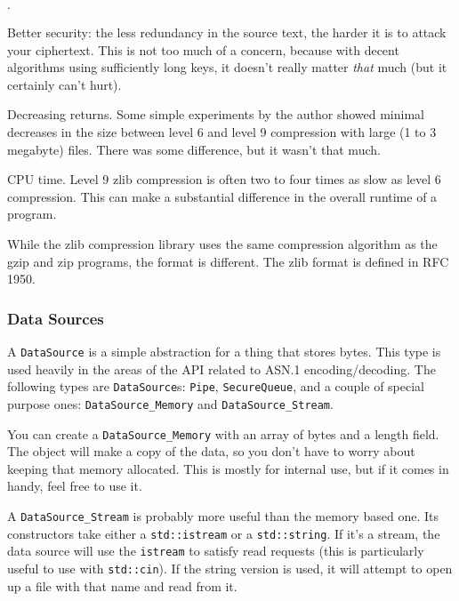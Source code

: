 \documentclass{article}
\newcommand{\type}[1]{\texttt{#1}}
\begin{document}
\begin{list}{$\cdot$}
  \item Better security: the less redundancy in the source text, the harder it
        is to attack your ciphertext. This is not too much of a concern,
        because with decent algorithms using sufficiently long keys, it doesn't
        really matter \emph{that} much (but it certainly can't hurt).
  \item

  \item Decreasing returns. Some simple experiments by the author showed
        minimal decreases in the size between level 6 and level 9 compression
        with large (1 to 3 megabyte) files. There was some difference, but it
        wasn't that much.

  \item CPU time. Level 9 zlib compression is often two to four times as slow
        as level 6 compression. This can make a substantial difference in the
        overall runtime of a program.
\end{list}

While the zlib compression library uses the same compression algorithm as the
gzip and zip programs, the format is different. The zlib format is defined in
RFC 1950.

\subsubsection{Data Sources}

A \type{DataSource} is a simple abstraction for a thing that stores bytes. This
type is used heavily in the areas of the API related to ASN.1
encoding/decoding. The following types are \type{DataSource}s: \type{Pipe},
\type{SecureQueue}, and a couple of special purpose ones:
\type{DataSource\_Memory} and \type{DataSource\_Stream}.

You can create a \type{DataSource\_Memory} with an array of bytes and a length
field. The object will make a copy of the data, so you don't have to worry
about keeping that memory allocated. This is mostly for internal use, but if it
comes in handy, feel free to use it.

A \type{DataSource\_Stream} is probably more useful than the memory based
one. Its constructors take either a \type{std::istream} or a
\type{std::string}. If it's a stream, the data source will use the
\type{istream} to satisfy read requests (this is particularly useful to use
with \type{std::cin}). If the string version is used, it will attempt to open
up a file with that name and read from it.
\end{document}
